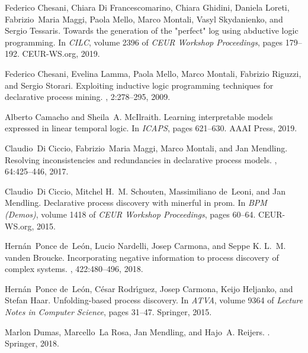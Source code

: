 \documentclass[a4wide,11pt]{article}
\theoremstyle{definition}
\theoremstyle{plain}
\begin{document}
\begin{thebibliography}{MWvdAvdB06}
Federico Chesani, Chiara {Di Francescomarino}, Chiara Ghidini, Daniela Loreti,
  Fabrizio~Maria Maggi, Paola Mello, Marco Montali, Vasyl Skydanienko, and
  Sergio Tessaris.
\newblock Towards the generation of the "perfect" log using abductive logic
  programming.
\newblock In {\em {CILC}}, volume 2396 of {\em {CEUR} Workshop Proceedings},
  pages 179--192. CEUR-WS.org, 2019.

Federico Chesani, Evelina Lamma, Paola Mello, Marco Montali, Fabrizio Riguzzi,
  and Sergio Storari.
\newblock Exploiting inductive logic programming techniques for declarative
  process mining.
, 2:278--295, 2009.

Alberto Camacho and Sheila~A. McIlraith.
\newblock Learning interpretable models expressed in linear temporal logic.
\newblock In {\em {ICAPS}}, pages 621--630. {AAAI} Press, 2019.

Claudio~Di Ciccio, Fabrizio~Maria Maggi, Marco Montali, and Jan Mendling.
\newblock Resolving inconsistencies and redundancies in declarative process
  models.
, 64:425--446, 2017.

Claudio~Di Ciccio, Mitchel H.~M. Schouten, Massimiliano de~Leoni, and Jan
  Mendling.
\newblock Declarative process discovery with minerful in prom.
\newblock In {\em {BPM} (Demos)}, volume 1418 of {\em {CEUR} Workshop
  Proceedings}, pages 60--64. CEUR-WS.org, 2015.

Hern{\'{a}}n~Ponce de~Le{\'{o}}n, Lucio Nardelli, Josep Carmona, and Seppe K.
  L.~M. vanden Broucke.
\newblock Incorporating negative information to process discovery of complex
  systems.
, 422:480--496, 2018.

Hern{\'{a}}n~Ponce de~Le{\'{o}}n, C{\'{e}}sar Rodr{\'{\i}}guez, Josep Carmona,
  Keijo Heljanko, and Stefan Haar.
\newblock Unfolding-based process discovery.
\newblock In {\em {ATVA}}, volume 9364 of {\em Lecture Notes in Computer
  Science}, pages 31--47. Springer, 2015.

Marlon Dumas, Marcello~La Rosa, Jan Mendling, and Hajo~A. Reijers.
.
\newblock Springer, 2018.


\end{thebibliography}
\end{document}
